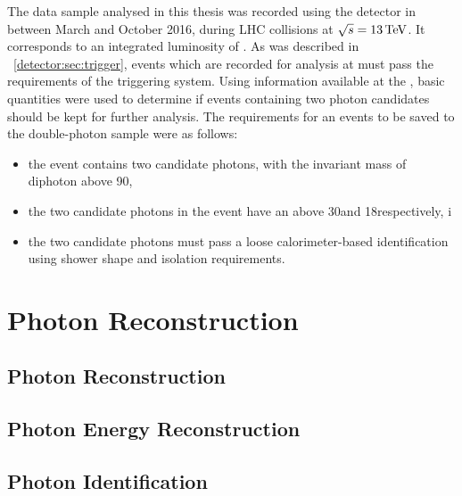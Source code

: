 The data sample analysed in this thesis was recorded using the \CMS detector in between March and October 2016, during \pp LHC collisions at $\sqrt{s}=13\,\text{Te\hspace{-.08em}V}$. It corresponds to an integrated luminosity of \totaldatatwentysixteen. As was described in \Sec~\ref{detector:sec:trigger}, events which are recorded for analysis at \CMS must pass the requirements of the triggering system. 
Using information available at the \HLT, basic quantities were used to determine if events containing two photon candidates should be kept for further analysis. The requirements for an events to be saved to the double-photon sample were as follows:

\begin{itemize}
\item the event contains two candidate photons, with the invariant mass of diphoton above 90\GeV,
\item the two candidate photons in the event have an \ET above 30\GeV and 18\GeV respectively,
i%
\item the two candidate photons must pass a loose calorimeter-based identification using shower shape and isolation requirements.

\end{itemize}
\section{Photon Reconstruction} 
\label{reco:sec:photons}
\subsection{Photon Reconstruction}
\subsection{Photon Energy Reconstruction}
\subsection{Photon Identification}

